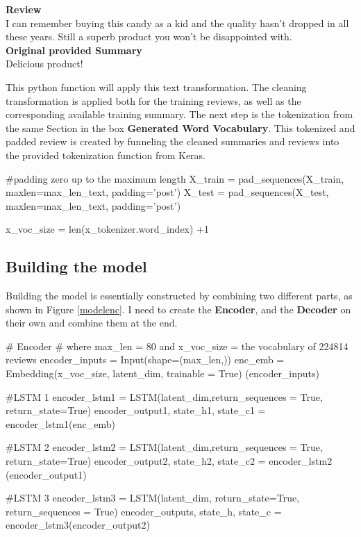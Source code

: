 \begin{tcolorbox}
	\textbf{Review} \\
	I can remember buying this candy as a kid and the quality hasn't dropped in all these years. Still a superb product you won't be disappointed with. \\
	
	\textbf{Original provided Summary} \\
	Delicious product!
\end{tcolorbox}

This python function will apply this text transformation. The cleaning transformation is applied both for the training reviews, as well as the corresponding available training summary. The next step is the tokenization from the same Section in the box \textbf{Generated Word Vocabulary}.
This tokenized and padded review is created by funneling the cleaned summaries and reviews into the provided tokenization function from Keras.

\begin{python}
	#padding zero up to the maximum length
	X_train = pad_sequences(X_train,  maxlen=max_len_text, padding='post') 
	X_test = pad_sequences(X_test, maxlen=max_len_text, padding='post')
	
	x_voc_size = len(x_tokenizer.word_index) +1
\end{python}


\subsection{Building the model}

Building the model is essentially constructed by combining two different parts, as shown in Figure \ref{modelenc}. I need to create the \textbf{Encoder}, and the \textbf{Decoder} on their own and combine them at the end.

\begin{python}[caption={Encoder in Python}]
# Encoder 
# where max_len = 80 and x_voc_size = the vocabulary of 224814 reviews
encoder_inputs = Input(shape=(max_len,)) 
enc_emb = Embedding(x_voc_size, latent_dim, trainable = True)
(encoder_inputs) 

#LSTM 1 
encoder_lstm1 = LSTM(latent_dim,return_sequences = True, return_state=True) 
encoder_output1, state_h1, state_c1 = encoder_lstm1(enc_emb) 

#LSTM 2 
encoder_lstm2 = LSTM(latent_dim,return_sequences = True, return_state=True) 
encoder_output2, state_h2, state_c2 = encoder_lstm2
(encoder_output1) 

#LSTM 3 
encoder_lstm3  = LSTM(latent_dim, return_state=True, 
return_sequences = True) 
encoder_outputs, state_h, state_c = encoder_lstm3(encoder_output2) 
\end{python} 


